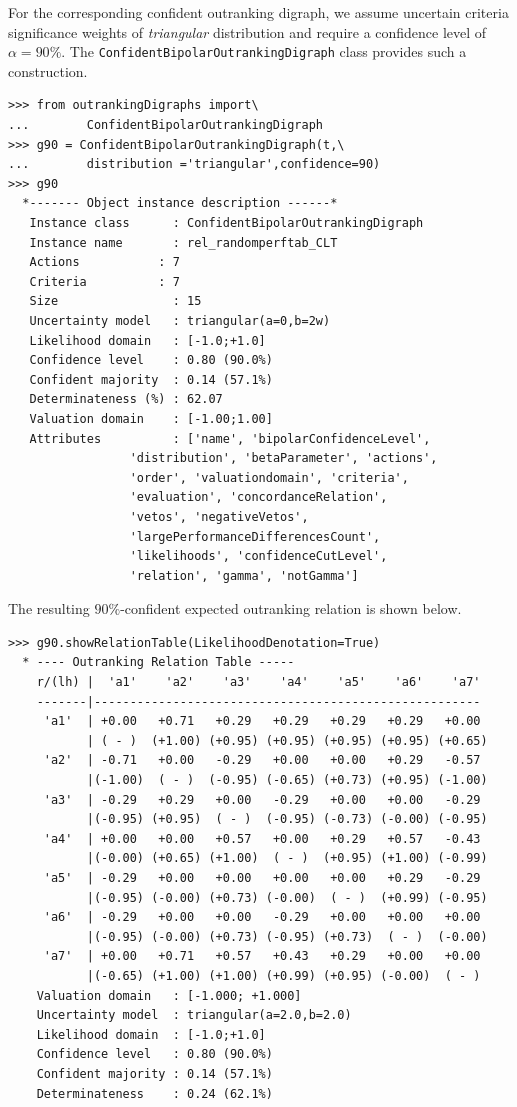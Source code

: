 For the corresponding confident outranking digraph, we assume uncertain criteria significance weights of \emph{triangular} distribution and require a confidence level of $\alpha = 90\%$. The \texttt{ConfidentBipolarOutrankingDigraph} class provides such a construction.
\begin{lstlisting}[label=list:18.2]
>>> from outrankingDigraphs import\
...        ConfidentBipolarOutrankingDigraph   
>>> g90 = ConfidentBipolarOutrankingDigraph(t,\
...        distribution ='triangular',confidence=90)
>>> g90
  *------- Object instance description ------*
   Instance class      : ConfidentBipolarOutrankingDigraph
   Instance name       : rel_randomperftab_CLT
   Actions           : 7
   Criteria          : 7
   Size                : 15
   Uncertainty model   : triangular(a=0,b=2w)
   Likelihood domain   : [-1.0;+1.0]
   Confidence level    : 0.80 (90.0%)
   Confident majority  : 0.14 (57.1%)
   Determinateness (%) : 62.07
   Valuation domain    : [-1.00;1.00]
   Attributes          : ['name', 'bipolarConfidenceLevel',
                 'distribution', 'betaParameter', 'actions',
                 'order', 'valuationdomain', 'criteria',
                 'evaluation', 'concordanceRelation',
                 'vetos', 'negativeVetos',
                 'largePerformanceDifferencesCount',
                 'likelihoods', 'confidenceCutLevel',
                 'relation', 'gamma', 'notGamma']
\end{lstlisting}

The resulting $90\%$-confident expected outranking relation is shown below.
\begin{lstlisting}[caption={$90\%$-confident outranking relation with triangular distributed significance weights},label=list:18.3,basicstyle=\ttfamily\scriptsize]
>>> g90.showRelationTable(LikelihoodDenotation=True)
  * ---- Outranking Relation Table -----
    r/(lh) |  'a1'    'a2'    'a3'    'a4'    'a5'    'a6'    'a7'	 
    -------|------------------------------------------------------
     'a1'  | +0.00   +0.71   +0.29   +0.29   +0.29   +0.29   +0.00  
           | ( - )  (+1.00) (+0.95) (+0.95) (+0.95) (+0.95) (+0.65) 
     'a2'  | -0.71   +0.00   -0.29   +0.00   +0.00   +0.29   -0.57  
           |(-1.00)  ( - )  (-0.95) (-0.65) (+0.73) (+0.95) (-1.00) 
     'a3'  | -0.29   +0.29   +0.00   -0.29   +0.00   +0.00   -0.29  
           |(-0.95) (+0.95)  ( - )  (-0.95) (-0.73) (-0.00) (-0.95) 
     'a4'  | +0.00   +0.00   +0.57   +0.00   +0.29   +0.57   -0.43  
       	   |(-0.00) (+0.65) (+1.00)  ( - )  (+0.95) (+1.00) (-0.99) 
     'a5'  | -0.29   +0.00   +0.00   +0.00   +0.00   +0.29   -0.29  
           |(-0.95) (-0.00) (+0.73) (-0.00)  ( - )  (+0.99) (-0.95) 
     'a6'  | -0.29   +0.00   +0.00   -0.29   +0.00   +0.00   +0.00  
           |(-0.95) (-0.00) (+0.73) (-0.95) (+0.73)  ( - )  (-0.00) 
     'a7'  | +0.00   +0.71   +0.57   +0.43   +0.29   +0.00   +0.00  
           |(-0.65) (+1.00) (+1.00) (+0.99) (+0.95) (-0.00)  ( - )  
    Valuation domain   : [-1.000; +1.000] 
    Uncertainty model  : triangular(a=2.0,b=2.0) 
    Likelihood domain  : [-1.0;+1.0] 
    Confidence level   : 0.80 (90.0%) 
    Confident majority : 0.14 (57.1%) 
    Determinateness    : 0.24 (62.1%)
\end{lstlisting}

